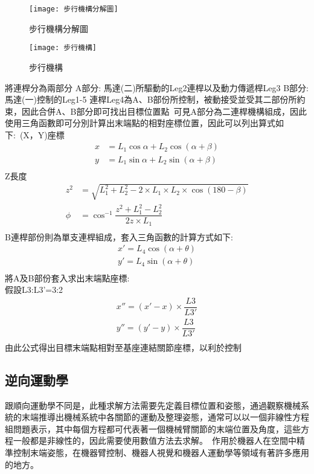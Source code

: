 \begin{figure}[htbp]
  \begin{minipage}[t]{0.45\linewidth}
    \centering
    \texttt{[image: 步行機構分解圖]}
    \caption{步行機構分解圖}
    \label{步行機構分解圖}
  \end{minipage}
  \hfill
  \begin{minipage}[t]{0.45\linewidth}
    \centering
    \texttt{[image: 步行機構]}
    \caption{步行機構}
    \label{步行機構}
  \end{minipage}
\end{figure}

將連桿分為兩部分
A部分: 馬達(二)所驅動的Leg2連桿以及動力傳遞桿Leg3
B部分:馬達(一)控制的Leg1-5
連桿Leg4為A、B部份所控制，被動接受並受其二部份所約束，因此合併A、B部分即可找出目標位置點\
可見A部分為二連桿機構組成，因此使用三角函數即可分別計算出末端點的相對座標位置，因此可以列出算式如下:\
(X，Y)座標
\[
\begin{aligned}
x&=L_{1}\cos \alpha +L_{2}\cos \left( \alpha +\beta \right)\\
y&=L_{1}\sin \alpha +L_{2}\sin \left( \alpha +\beta \right)\\
\end{aligned}
\]
Z長度
\[
\begin{aligned}
z^{2}&=\sqrt{L_{1}^{2}+L_{2}^{2}-2\times L_{1}\times L_{2}\times \cos \left( 180-\beta \right) }\\
\phi&=\cos ^{-1}\dfrac{z^{2}+L_{1}^{2}-L_{2}^{2}}{2z\times L_{1}}\\
\end{aligned}
\]
B連桿部份則為單支連桿組成，套入三角函數的計算方式如下:\\
\[
\begin{aligned}
x'=L_{4}\cos \left( \alpha +\theta \right)\\
y'=L_{4}\sin \left( \alpha +\theta \right)\\
\end{aligned}
\]
將A及B部份套入求出末端點座標:\\
假設L3:L3'=3:2\
\[
\begin{aligned}
x''=\left( x'-x\right) \times \dfrac{L3}{L3'}\\
y''=\left( y'-y\right) \times \dfrac{L3}{L3'}\\
\end{aligned}
\]
由此公式得出目標末端點相對至基座連結關節座標，以利於控制\

\subsection{逆向運動學}
跟順向運動學不同是，此種求解方法需要先定義目標位置和姿態，通過觀察機械系統的末端推導出機械系統中各關節的運動及整理姿態，通常可以以一個非線性方程組問題表示，其中每個方程都可代表著一個機械臂關節的末端位置及角度，這些方程一般都是非線性的，因此需要使用數值方法去求解。\
作用於機器人在空間中精準控制末端姿態，在機器臂控制、機器人視覺和機器人運動學等領域有著許多應用的地方。\\

